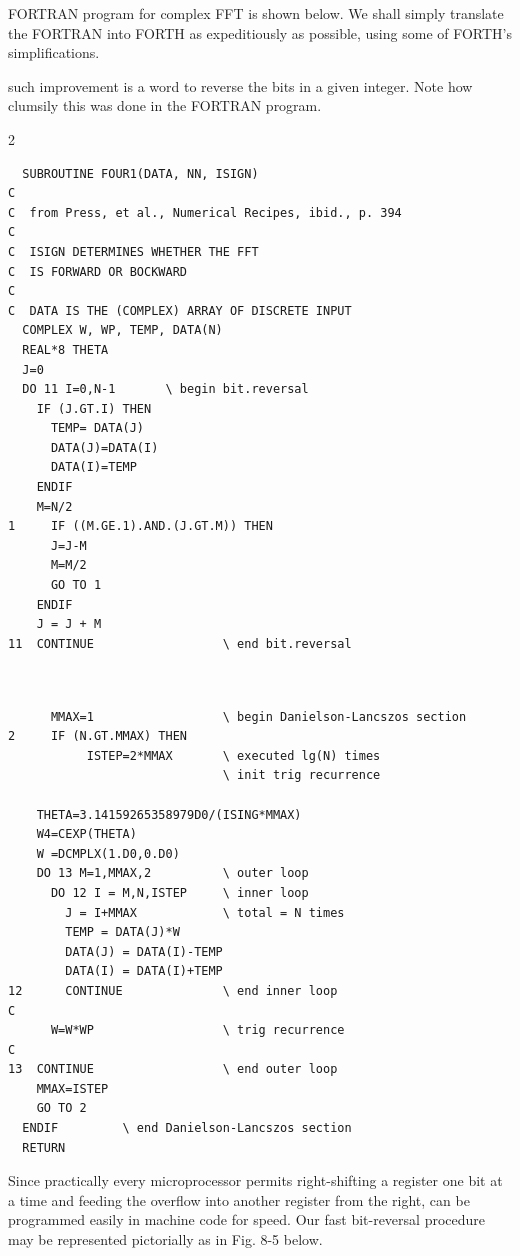  FORTRAN program for complex FFT is shown below. We shall simply translate the FORTRAN into FORTH as expeditiously as possible, using some of FORTH's simplifications.

 such improvement is a word to reverse the bits in a given integer. Note how clumsily this was done in the FORTRAN program.

\begin{multicols}{2}
    \tiny
    \begin{verbatim}
  SUBROUTINE FOUR1(DATA, NN, ISIGN)
C
C  from Press, et al., Numerical Recipes, ibid., p. 394
C   
C  ISIGN DETERMINES WHETHER THE FFT
C  IS FORWARD OR BOCKWARD
C
C  DATA IS THE (COMPLEX) ARRAY OF DISCRETE INPUT 
  COMPLEX W, WP, TEMP, DATA(N)
  REAL*8 THETA
  J=0
  DO 11 I=0,N-1       \ begin bit.reversal
    IF (J.GT.I) THEN
      TEMP= DATA(J)
      DATA(J)=DATA(I)
      DATA(I)=TEMP
    ENDIF
    M=N/2
1     IF ((M.GE.1).AND.(J.GT.M)) THEN
      J=J-M
      M=M/2
      GO TO 1
    ENDIF
    J = J + M
11  CONTINUE                  \ end bit.reversal
    \end{verbatim}
    \begin{verbatim}
    
    
      MMAX=1                  \ begin Danielson-Lancszos section
2     IF (N.GT.MMAX) THEN     
           ISTEP=2*MMAX       \ executed lg(N) times
                              \ init trig recurrence

    THETA=3.14159265358979D0/(ISING*MMAX)
    W4=CEXP(THETA)
    W =DCMPLX(1.D0,0.D0)
    DO 13 M=1,MMAX,2          \ outer loop
      DO 12 I = M,N,ISTEP     \ inner loop
        J = I+MMAX            \ total = N times
        TEMP = DATA(J)*W
        DATA(J) = DATA(I)-TEMP
        DATA(I) = DATA(I)+TEMP
12      CONTINUE              \ end inner loop
C
      W=W*WP                  \ trig recurrence
C
13  CONTINUE                  \ end outer loop
    MMAX=ISTEP
    GO TO 2
  ENDIF         \ end Danielson-Lancszos section
  RETURN
    \end{verbatim}
\end{multicols}

Since practically every microprocessor permits right-shifting a register one bit at a time and feeding the overflow into another register from the right,  can be programmed easily in machine code for speed. Our fast bit-reversal procedure  may be represented pictorially as in Fig. 8-5 below.



